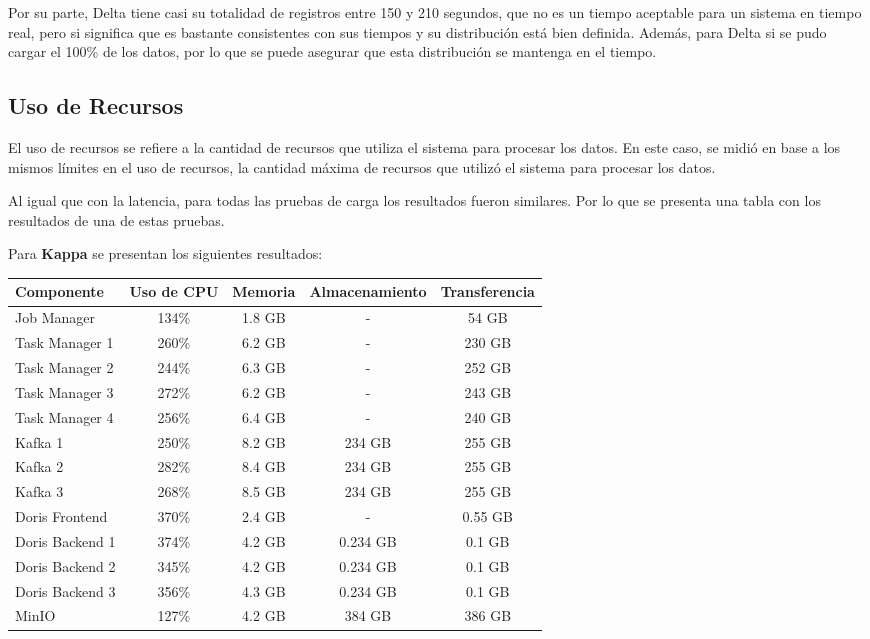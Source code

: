 Por su parte, Delta tiene casi su totalidad de registros entre 150 y 210 segundos,
que no es un tiempo aceptable para un sistema en tiempo real, 
pero si significa que es bastante consistentes con sus tiempos y su distribución está bien definida.
Además, para Delta si se pudo cargar el 100\% de los datos, por lo que se puede asegurar que esta distribución se mantenga en el tiempo.

\newpage

\newpage
\subsection{Uso de Recursos}

El uso de recursos se refiere a la cantidad de recursos que utiliza el sistema para procesar los datos.
En este caso, se midió en base a los mismos límites en el uso de recursos, 
la cantidad máxima de recursos que utilizó el sistema para procesar los datos. \newline

Al igual que con la latencia, para todas las pruebas de carga los resultados fueron similares. 
Por lo que se presenta una tabla con los resultados de una de estas pruebas. \newline

Para \textbf{Kappa} se presentan los siguientes resultados:

\begin{longtable}{|p{3cm}|c|c|c|c|}
    \hline
    \textbf{Componente} & \textbf{Uso de CPU} & \textbf{Memoria} & \textbf{Almacenamiento} & \textbf{Transferencia} \\
    \hline
    Job Manager & 134\% & 1.8 GB & - & 54 GB \\
    \hline
    Task Manager 1 & 260\% & 6.2 GB & - & 230 GB \\
    \hline
    Task Manager 2 & 244\% & 6.3 GB & - & 252 GB \\
    \hline
    Task Manager 3 & 272\% & 6.2 GB & - & 243 GB \\
    \hline
    Task Manager 4 & 256\% & 6.4 GB & - & 240 GB \\
    \hline
    Kafka 1 & 250\% & 8.2 GB & 234 GB & 255 GB \\
    \hline
    Kafka 2 & 282\% & 8.4 GB & 234 GB & 255 GB \\
    \hline
    Kafka 3 & 268\% & 8.5 GB & 234 GB & 255 GB \\
    \hline
    Doris Frontend & 370\% & 2.4 GB & - & 0.55 GB \\
    \hline
    Doris Backend 1 & 374\% & 4.2 GB & 0.234 GB & 0.1 GB \\
    \hline
    Doris Backend 2 & 345\% & 4.2 GB & 0.234 GB & 0.1 GB \\
    \hline
    Doris Backend 3 & 356\% & 4.3 GB & 0.234 GB & 0.1 GB \\
    \hline
    MinIO & 127\% & 4.2 GB & 384 GB & 386 GB \\
    \hline
\end{longtable}

